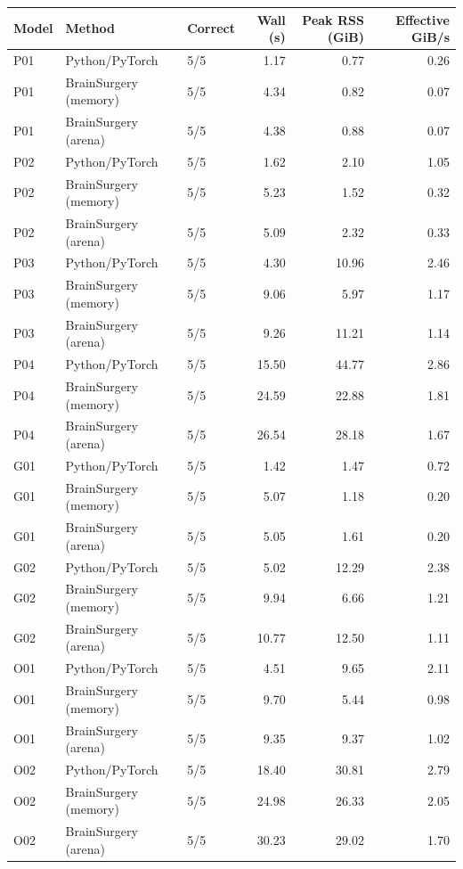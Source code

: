 \begin{table}[t]
\centering
\small
\begin{tabular}{lllrrr}
\toprule
Model & Method & Correct & Wall (s) & Peak RSS (GiB) & Effective GiB/s \\
\midrule
P01 & Python/PyTorch & 5/5 & 1.17 & 0.77 & 0.26 \\
P01 & BrainSurgery (memory) & 5/5 & 4.34 & 0.82 & 0.07 \\
P01 & BrainSurgery (arena) & 5/5 & 4.38 & 0.88 & 0.07 \\
P02 & Python/PyTorch & 5/5 & 1.62 & 2.10 & 1.05 \\
P02 & BrainSurgery (memory) & 5/5 & 5.23 & 1.52 & 0.32 \\
P02 & BrainSurgery (arena) & 5/5 & 5.09 & 2.32 & 0.33 \\
P03 & Python/PyTorch & 5/5 & 4.30 & 10.96 & 2.46 \\
P03 & BrainSurgery (memory) & 5/5 & 9.06 & 5.97 & 1.17 \\
P03 & BrainSurgery (arena) & 5/5 & 9.26 & 11.21 & 1.14 \\
P04 & Python/PyTorch & 5/5 & 15.50 & 44.77 & 2.86 \\
P04 & BrainSurgery (memory) & 5/5 & 24.59 & 22.88 & 1.81 \\
P04 & BrainSurgery (arena) & 5/5 & 26.54 & 28.18 & 1.67 \\
G01 & Python/PyTorch & 5/5 & 1.42 & 1.47 & 0.72 \\
G01 & BrainSurgery (memory) & 5/5 & 5.07 & 1.18 & 0.20 \\
G01 & BrainSurgery (arena) & 5/5 & 5.05 & 1.61 & 0.20 \\
G02 & Python/PyTorch & 5/5 & 5.02 & 12.29 & 2.38 \\
G02 & BrainSurgery (memory) & 5/5 & 9.94 & 6.66 & 1.21 \\
G02 & BrainSurgery (arena) & 5/5 & 10.77 & 12.50 & 1.11 \\
O01 & Python/PyTorch & 5/5 & 4.51 & 9.65 & 2.11 \\
O01 & BrainSurgery (memory) & 5/5 & 9.70 & 5.44 & 0.98 \\
O01 & BrainSurgery (arena) & 5/5 & 9.35 & 9.37 & 1.02 \\
O02 & Python/PyTorch & 5/5 & 18.40 & 30.81 & 2.79 \\
O02 & BrainSurgery (memory) & 5/5 & 24.98 & 26.33 & 2.05 \\
O02 & BrainSurgery (arena) & 5/5 & 30.23 & 29.02 & 1.70 \\

\end{tabular}
\end{table}
